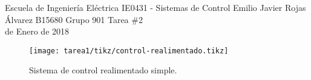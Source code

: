 \documentclass{ucrEieTarea}
\begin{document}
    {Escuela de Ingeniería Eléctrica}
    {IE0431 - Sistemas de Control}
    {Emilio Javier Rojas Álvarez}
    {B15680}
    {Grupo 901}
    {Tarea \#2\\{\footnotesize{} de Enero de 2018}}
  
  \begin{figure}[H]
    \centering
    \texttt{[image: tarea1/tikz/control-realimentado.tikz]}
    \caption{Sistema de control realimentado simple.}
    \label{img:ejercicio1}
  \end{figure}
  
  
\end{document}
